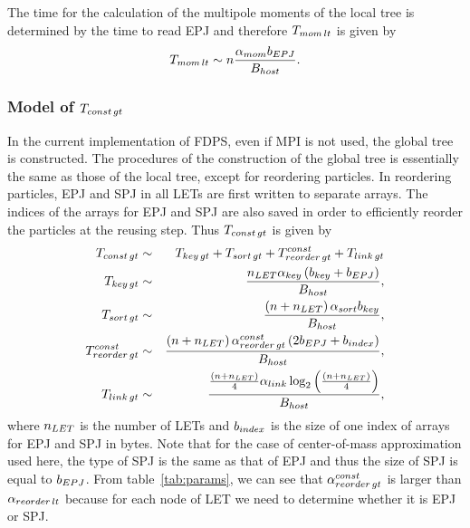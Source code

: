 \documentclass[dvipdfmx]{pasj01}
\begin{document}
The time for the calculation of the multipole moments of the local
tree is determined by the time to read EPJ and therefore $T_{\rm mom\,
  lt}$ is given by
\begin{equation}
  T_{\rm mom\, lt} \sim n \frac{\alpha_{\rm mom} b_{\rm EPJ}}{B_{\rm host}}.
  \label{eq:model_lt_mom}
\end{equation}

%

\subsubsection{Model of $T_{\rm const\, gt}$}

In the current implementation of FDPS, even if MPI is not used, the
global tree is constructed. The procedures of the construction of the
global tree is essentially the same as those of the local tree, except
for reordering particles. In reordering particles, EPJ and SPJ in all
LETs are first written to separate arrays. The indices of the arrays
for EPJ and SPJ are also saved in order to efficiently reorder the
particles at the reusing step. Thus $T_{\rm const\, gt}$ is given by
\begin{eqnarray}
  T_{\rm const\, gt} & \sim & 
  T_{\rm key\, gt} + T_{\rm sort\, gt} + T^{\rm const}_{\rm reorder\, gt} + T_{\rm link\, gt} \\
  T_{\rm key\, gt} & \sim & \frac{n_{\rm LET}  \alpha_{\rm key} \left(b_{\rm key}+b_{\rm EPJ} \right)}{B_{\rm host}} , \label{eq:gt_key} \\
  T_{\rm sort\, gt} & \sim  & \frac{\left(n+ n_{\rm LET} \right) \alpha_{\rm sort} b_{\rm key}}{B_{\rm host}} , \\
  T^{\rm const}_{\rm reorder\, gt} & \sim & \frac{\left(n+ n_{\rm LET}\right) \alpha^{\rm const}_{\rm reorder\, gt} \left( 2b_{\rm EPJ} + b_{\rm index} \right) }{B_{\rm host}} , \\ \label{eq:gt_sort_ptcl_const}
  T_{\rm link\, gt} & \sim &  \frac{ \frac{\left(n+ n_{\rm LET}\right)}{4} \alpha_{\rm link} \log_2\left( \frac{\left(n+ n_{\rm LET}\right)}{4} \right)}{B_{\rm host}} ,  \label{eq:gt_link}
\end{eqnarray}
where $n_{\rm LET}$ is the number of LETs and $b_{\rm index}$ is the
size of one index of arrays for EPJ and SPJ in bytes. Note that for
the case of center-of-mass approximation used here, the type of SPJ is
the same as that of EPJ and thus the size of SPJ is equal to $b_{\rm
  EPJ}$. From table~\ref{tab:params}, we can see that $\alpha^{\rm
  const}_{\rm reorder\, gt}$ is larger than $\alpha_{\rm reorder\,
  lt}$ because for each node of LET we need to determine whether it is
EPJ or SPJ.
\end{document}
